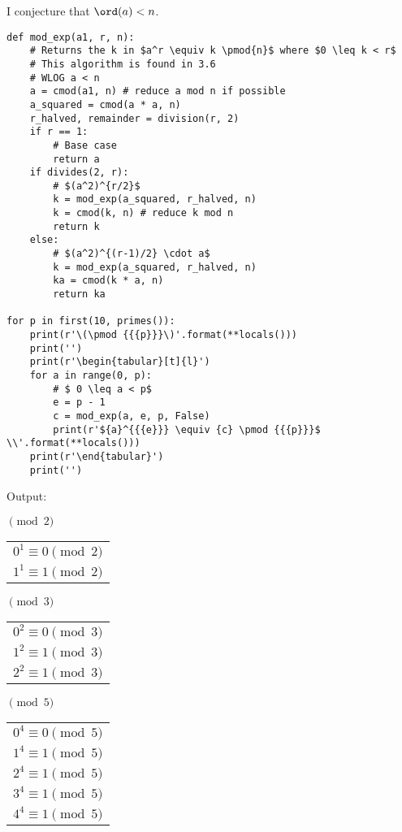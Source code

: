 I conjecture that \(\ord(a) < n\).

\begin{verbatim}
def mod_exp(a1, r, n):
    # Returns the k in $a^r \equiv k \pmod{n}$ where $0 \leq k < r$
    # This algorithm is found in 3.6
    # WLOG a < n
    a = cmod(a1, n) # reduce a mod n if possible
    a_squared = cmod(a * a, n)
    r_halved, remainder = division(r, 2)
    if r == 1:
        # Base case
        return a
    if divides(2, r):
        # $(a^2)^{r/2}$
        k = mod_exp(a_squared, r_halved, n)
        k = cmod(k, n) # reduce k mod n
        return k
    else:
        # $(a^2)^{(r-1)/2} \cdot a$
        k = mod_exp(a_squared, r_halved, n)
        ka = cmod(k * a, n)
        return ka

for p in first(10, primes()):
    print(r'\(\pmod {{{p}}}\)'.format(**locals()))
    print('')
    print(r'\begin{tabular}[t]{l}')
    for a in range(0, p):
        # $ 0 \leq a < p$
        e = p - 1
        c = mod_exp(a, e, p, False)
        print(r'${a}^{{{e}}} \equiv {c} \pmod {{{p}}}$ \\'.format(**locals()))
    print(r'\end{tabular}')
    print('')
\end{verbatim}

Output:

\(\pmod {2}\)

\begin{tabular}[t]{l}
$0^{1} \equiv 0 \pmod {2}$ \\
$1^{1} \equiv 1 \pmod {2}$ \\
\end{tabular}

\(\pmod {3}\)

\begin{tabular}[t]{l}
$0^{2} \equiv 0 \pmod {3}$ \\
$1^{2} \equiv 1 \pmod {3}$ \\
$2^{2} \equiv 1 \pmod {3}$ \\
\end{tabular}

\(\pmod {5}\)

\begin{tabular}[t]{l}
$0^{4} \equiv 0 \pmod {5}$ \\
$1^{4} \equiv 1 \pmod {5}$ \\
$2^{4} \equiv 1 \pmod {5}$ \\
$3^{4} \equiv 1 \pmod {5}$ \\
$4^{4} \equiv 1 \pmod {5}$ \\
\end{tabular}

